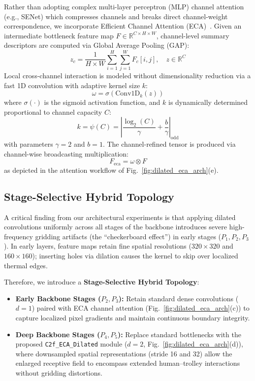 \documentclass[journal,twoside,web]{ieeecolor}
\begin{document}
Rather than adopting complex multi-layer perceptron (MLP) channel attention (e.g., SENet) which compresses channels and breaks direct channel-weight correspondence, we incorporate Efficient Channel Attention (ECA)~\cite{wang2020eca}. Given an intermediate bottleneck feature map $F \in \mathbb{R}^{C \times H \times W}$, channel-level summary descriptors are computed via Global Average Pooling (GAP):
\begin{equation}
z_c = \frac{1}{H \times W} \sum_{i=1}^H \sum_{j=1}^W F_c[i, j], \quad z \in \mathbb{R}^C
\label{eq:gap}
\end{equation}
Local cross-channel interaction is modeled without dimensionality reduction via a fast 1D convolution with adaptive kernel size $k$:
\begin{equation}
\omega = \sigma\left(\mathrm{Conv1D}_k(z)\right)
\label{eq:eca_conv1d}
\end{equation}
where $\sigma(\cdot)$ is the sigmoid activation function, and $k$ is dynamically determined proportional to channel capacity $C$:
\begin{equation}
k = \psi(C) = \left| \frac{\log_2(C)}{\gamma} + \frac{b}{\gamma} \right|_{\text{odd}}
\label{eq:adaptive_k}
\end{equation}
with parameters $\gamma=2$ and $b=1$. The channel-refined tensor is produced via channel-wise broadcasting multiplication:
\begin{equation}
F_{\text{eca}} = \omega \otimes F
\label{eq:recalibrated_tensor}
\end{equation}
as depicted in the attention workflow of Fig.~\ref{fig:dilated_eca_arch}(e).

\subsection{Stage-Selective Hybrid Topology}
A critical finding from our architectural experiments is that applying dilated convolutions uniformly across all stages of the backbone introduces severe high-frequency gridding artifacts (the ``checkerboard effect'') in early stages ($P_1, P_2, P_3$). In early layers, feature maps retain fine spatial resolutions ($320\times320$ and $160\times160$); inserting holes via dilation causes the kernel to skip over localized thermal edges.

Therefore, we introduce a \textbf{Stage-Selective Hybrid Topology}:
\begin{itemize}
    \item \textbf{Early Backbone Stages ($P_2, P_3$):} Retain standard dense convolutions ($d=1$) paired with ECA channel attention (Fig.~\ref{fig:dilated_eca_arch}(c)) to capture localized pixel gradients and maintain continuous boundary integrity.
    \item \textbf{Deep Backbone Stages ($P_4, P_5$):} Replace standard bottlenecks with the proposed \texttt{C2f\_ECA\_Dilated} module ($d=2$, Fig.~\ref{fig:dilated_eca_arch}(d)), where downsampled spatial representations (stride 16 and 32) allow the enlarged receptive field to encompass extended human--trolley interactions without gridding distortions.
\end{itemize}
\end{document}
